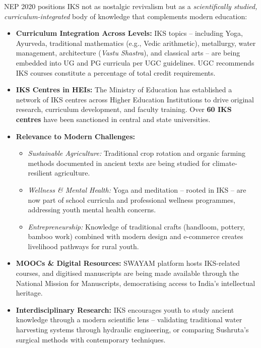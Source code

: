 \documentclass[11pt,a4paper]{article}
\begin{document}
NEP 2020 positions IKS not as nostalgic revivalism but as a \textit{scientifically studied, curriculum-integrated} body of knowledge that complements modern education:

\begin{itemize}
  \item \textbf{Curriculum Integration Across Levels:} IKS topics -- including Yoga, Ayurveda, traditional mathematics (e.g., Vedic arithmetic), metallurgy, water management, architecture (\textit{Vastu Shastra}), and classical arts -- are being embedded into UG and PG curricula per UGC guidelines. UGC recommends IKS courses constitute a percentage of total credit requirements.

  \item \textbf{IKS Centres in HEIs:} The Ministry of Education has established a network of IKS centres across Higher Education Institutions to drive original research, curriculum development, and faculty training. Over \textbf{60 IKS centres} have been sanctioned in central and state universities.

  \item \textbf{Relevance to Modern Challenges:}
  \begin{itemize}
    \item \textit{Sustainable Agriculture:} Traditional crop rotation and organic farming methods documented in ancient texts are being studied for climate-resilient agriculture.
    \item \textit{Wellness \& Mental Health:} Yoga and meditation -- rooted in IKS -- are now part of school curricula and professional wellness programmes, addressing youth mental health concerns.
    \item \textit{Entrepreneurship:} Knowledge of traditional crafts (handloom, pottery, bamboo work) combined with modern design and e-commerce creates livelihood pathways for rural youth.
  \end{itemize}

  \item \textbf{MOOCs \& Digital Resources:} SWAYAM platform hosts IKS-related courses, and digitised manuscripts are being made available through the National Mission for Manuscripts, democratising access to India's intellectual heritage.

  \item \textbf{Interdisciplinary Research:} IKS encourages youth to study ancient knowledge through a modern scientific lens -- validating traditional water harvesting systems through hydraulic engineering, or comparing Sushruta's surgical methods with contemporary techniques.
\end{itemize}
\end{document}

